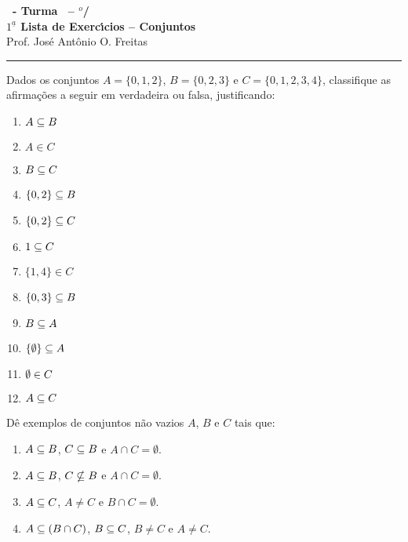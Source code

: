 \documentclass[12pt]{exam}
\begin{document}
\begin{center}
{\Large\bf \disciplina\ - Turma \turma\ -- \semestre$^{o}$/\ano} \\ \vspace{9pt} {\large\bf
  $1^{\underline{a}}$ Lista de Exerc{\'\i}cios -- Conjuntos}\\ \vspace{9pt} Prof. Jos{\'e} Ant{\^o}nio O. Freitas
\end{center}
\hrule


\vspace{.6cm}

\questao Dados os conjuntos $A = \{0,1,2\}$, $B = \{0,2,3\}$ e $C = \{0,1,2,3,4\}$, classifique as afirma\c{c}\~oes a seguir em verdadeira ou falsa, justificando:
\begin{multicols}{2}
	\begin{enumerate}[label={\alph*})]
		\item $A \subseteq B$
		\item $A \in C$
		\item $B \subseteq C$
		\item $\{0,2\} \subseteq B$
		\item $\{0,2\} \subseteq C$
		\item $1 \subseteq C$
		\item $\{1,4\} \in C$
		\item $\{0,3\} \subseteq B$
		\item $B \subseteq A$
		\item $\{\emptyset\} \subseteq A$
		\item $\emptyset \in C$
		\item $A \subseteq C$
	\end{enumerate}	
\end{multicols}

\questao D\^e exemplos de conjuntos n\~ao vazios $A$, $B$ e $C$ tais que:
\begin{enumerate}[label={\alph*})]
	\item $A \subseteq B$, $C \subseteq B$ e $A \cap C = \emptyset$.
	\item $A \subseteq B$, $C \nsubseteq B$ e $A \cap C = \emptyset$.
	\item $A \subseteq C$, $A \ne C$ e $B \cap C = \emptyset$.
	\item $A \subseteq (B \cap C)$, $B \subseteq C$, $B \ne C$ e $A \ne C$.
\end{enumerate}

\vspace{.3cm}
\end{document}
